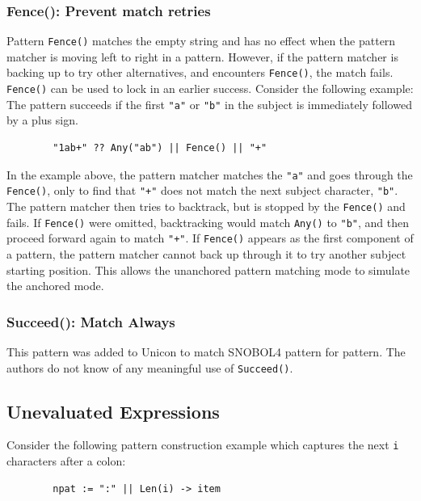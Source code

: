 \documentclass[letterpaper,12pt]{article}
\begin{document}
\subsubsection{Fence(): Prevent match retries}

Pattern {\tt Fence()} matches the empty string and has no effect when the
pattern matcher is moving left to right in a pattern. However, if the
pattern matcher is backing up to try other alternatives, and
encounters {\tt Fence()}, the match fails. {\tt Fence()} can be used to
lock in an earlier success. Consider the following example: The pattern
succeeds if the first {\tt "a"} or {\tt "b"} in the subject is immediately
followed by a plus sign.

\begin{verbatim}
        "1ab+" ?? Any("ab") || Fence() || "+"
\end{verbatim}

In the example above, the pattern matcher matches the {\tt "a"} and
goes through the {\tt Fence()}, only to find that {\tt "+"} does not match the
next subject character, {\tt "b"}. The pattern matcher then tries to
backtrack, but is stopped by the {\tt Fence()} and fails.  If {\tt Fence()}
were omitted, backtracking would match {\tt Any()} to {\tt "b"}, and
then proceed
forward again to match {\tt "+"}.  If {\tt Fence()} appears as the first
component of a pattern, the pattern matcher cannot back up through it
to try another subject starting position. This allows the unanchored
pattern matching mode to simulate the anchored mode.

\subsubsection{Succeed(): Match Always}

This pattern was added to Unicon to match SNOBOL4 pattern for
pattern. The authors do not know of any meaningful use of {\tt Succeed()}.


\subsection{Unevaluated Expressions}

Consider the following pattern construction example which captures the
next {\tt i} characters after a colon:

\begin{verbatim}
        npat := ":" || Len(i) -> item
\end{verbatim}
\end{document}
